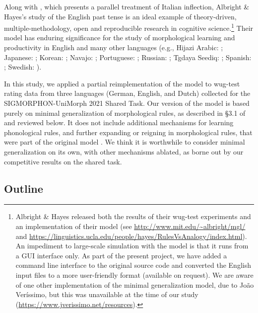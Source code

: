 \documentclass[11pt]{article}
\begin{document}
Along with \citet{albright2002}, which presents a parallel treatment of Italian inflection, Albright \& Hayes's study of the English past tense is an ideal example of theory-driven, multiple-methodology, open and reproducible research in cognitive science.\footnote{Albright \& Hayes released both the results of their wug-test experiments and an implementation of their model (see \url{http://www.mit.edu/~albright/mgl/} and \url{https://linguistics.ucla.edu/people/hayes/RulesVsAnalogy/index.html}). An impediment to large-scale simulation with the model is that it runs from a GUI interface only. As part of the present project, we have added a command line interface to the original source code and converted the English input files to a more user-friendly format (available on request). We are aware of one other implementation of the minimal generalization model, due to Jo\~{a}o Ver\'issimo, but this was unavailable at the time of our study (\url{https://www.jverissimo.net/resources}).} Their model has enduring significance for the study of morphological learning and productivity in English \citep[e.g.,][]{racz-etal-2014-rules, racz2020, corkery-etal-2019-yet} and many other languages (e.g., Hijazi Arabic: \citealt{ahyad2019}; Japanese: \citealt{oseki-etal-2019-inverting}; Korean: \citealt{albright2009}; Navajo: \citealt{albright2006}; Portuguese: \citealt{verissimo2014}; Russian: \citealt{kapatsinski2010}; Tgdaya Seediq: \citealt{kuo2020}; Spanish: \citealt{albright2003}; Swedish: \citealt{strik2014}).


In this study, we applied a partial reimplementation of the \citet{albright-hayes-2002-modeling, albright2003} model to wug-test rating data from three languages (German, English, and Dutch) collected for the SIGMORPHON-UniMorph 2021 Shared Task. Our version of the model is based purely on minimal generalization of morphological rules, as described in \S3.1 of \citet{albright-hayes-2002-modeling} and reviewed below. It does not include additional mechanisms for learning phonological rules, and further expanding or reigning in morphological rules, that were part of the original model \citep[see][\S3.3 - \S3.7]{albright-hayes-2002-modeling}. We think it is worthwhile to consider minimal generalization on its own, with other mechanisms ablated, as borne out by our competitive results on the shared task.

\subsection{Outline}
\end{document}
